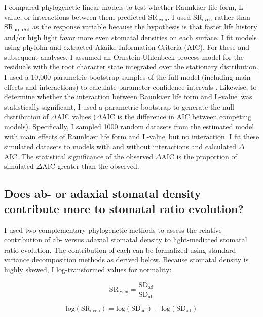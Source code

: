 \documentclass[12pt, oneside]{article}
\newcommand{\pkg}[1]{{\fontseries{b}\selectfont #1}}
\newcommand{\el}{L-value}
\begin{document}
I compared phylogenetic linear models to test whether Raunki\ae r life form, \el, or interactions between them predicted $\textrm{SR}_\textrm{even}$. I used $\textrm{SR}_\textrm{even}$ rather than $\textrm{SR}_\textrm{propAd}$ as the response variable because the hypothesis is that faster life history and/or high light favor more even stomatal densities on each surface. I fit models using \pkg{phylolm} and extracted Akaike Information Criteria (AIC). For these and subsequent analyses, I assumed an Ornstein-Uhlenbeck process model for the residuals with the root character state integrated over the stationary distribution. I used a 10,000 parametric bootstrap samples of the full model (including main effects and interactions) to calculate parameter confidence intervals \citep{Boettiger_etal_2012}. Likewise, to determine whether the interaction between Raunki\ae r life form and \el~was statistically significant, I used a parametric bootstrap to generate the null distribution of $\Delta$AIC values ($\Delta$AIC is the difference in AIC between competing models). Specifically, I sampled 1000 random datasets from the estimated model with main effects of Raunki\ae r life form and \el~but no interaction. I fit these simulated datasets to models with and without interactions and  calculated $\Delta$AIC. The statistical significance of the observed $\Delta$AIC is the proportion of simulated $\Delta$AIC greater than the observed.

\subsection*{Does ab- or adaxial stomatal density contribute more to stomatal ratio evolution?}

I used two complementary phylogenetic methods to assess the relative contribution of ab- versus adaxial stomatal density to light-mediated stomatal ratio evolution. The contribution of each can be formalized using standard variance decomposition methods as derived below. Because stomatal density is highly skewed, I log-transformed values for normality:
 
\begin{equation} \label{eq:SReven2} 
  \mathrm{SR_{even}} = \frac{\mathrm{SD_{ad}}}{\mathrm{SD_{ab}}}
\end{equation}

\begin{equation} \label{eq:logSReven} 
  \mathrm{log(SR_{even})} = \mathrm{log(SD_{ad})} - \mathrm{log(SD_{ad})}
\end{equation}
\end{document}
